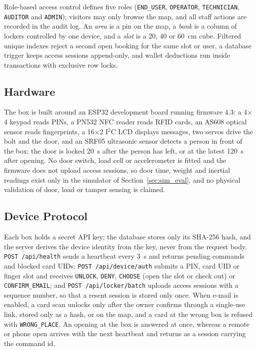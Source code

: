\documentclass[manuscript,screen]{acmart}
\begin{document}
Role-based access control defines five roles (\texttt{END\_USER}, \texttt{OPERATOR}, \texttt{TECHNICIAN},
\texttt{AUDITOR} and \texttt{ADMIN}); visitors may only browse the map, and all staff actions are recorded in the audit
log. An \emph{area} is a pin on the map, a \emph{bank} is a column of lockers controlled by one device, and a
\emph{slot} is a 20, 40 or 60~cm cube. Filtered unique indexes reject a second open booking for the same slot or user, a
database trigger keeps access sessions append-only, and wallet deductions run inside transactions with exclusive row
locks.

\subsection{Hardware}

The box is built around an ESP32 development board running firmware 4.3: a 4$\times$4 keypad reads PINs, a PN532 NFC
reader reads RFID cards, an AS608 optical sensor reads fingerprints, a 16$\times$2 I$^2$C LCD displays messages, two
servos drive the bolt and the door, and an SRF05 ultrasonic sensor detects a person in front of the box; the door is
locked 20~s after the person has left, or at the latest 120~s after opening. No door switch, load cell or accelerometer is
fitted and the firmware does not upload access sessions, so door time, weight and inertial readings exist only in the
simulator of Section~\ref{sec:sim_eval}, and no physical validation of door, load or tamper sensing is claimed.

\subsection{Device Protocol}

Each box holds a secret API key; the database stores only its SHA-256 hash, and the server derives the device identity
from the key, never from the request body. \texttt{POST /api/health} sends a heartbeat every 3~s and returns pending
commands and blocked card UIDs; \texttt{POST /api/device/auth} submits a PIN, card UID or finger slot and receives
\texttt{UNLOCK}, \texttt{DENY}, \texttt{CHOOSE} (open the slot or check out) or \texttt{CONFIRM\_EMAIL}; and
\texttt{POST /api/locker/batch} uploads
access sessions with a sequence number, so that a resent session is stored only once. When e-mail is enabled, a card
scan unlocks only after the owner confirms through a single-use link, stored only as a hash, or on the map, and a card
at the wrong box is refused with \texttt{WRONG\_PLACE}. An opening at the box is answered at once, whereas a remote or
phone open arrives with the next heartbeat and returns as a session carrying the command id.
\end{document}

